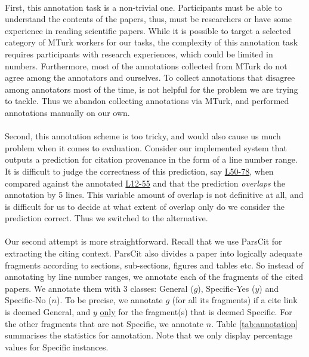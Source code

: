 \paragraph{}
First, this annotation task is a non-trivial one. Participants must be able to understand the contents of the papers, thus, must be researchers or have some experience in reading scientific papers. While it is possible to target a selected category of MTurk workers for our tasks, the complexity of this annotation task requires participants with research experiences, which could be limited in numbers. Furthermore, most of the annotations collected from MTurk do not agree among the annotators and ourselves. To collect annotations that disagree among annotators most of the time, is not helpful for the problem we are trying to tackle. Thus we abandon collecting annotations via MTurk, and performed annotations manually on our own.

\paragraph{}
Second, this annotation scheme is too tricky, and would also cause us much problem when it comes to evaluation. Consider our implemented system that outputs a prediction for citation provenance in the form of a line number range. It is difficult to judge the correctness of this prediction, say \url{L50-78}, when compared against the annotated \url{L12-55} and that the prediction \textit{overlaps} the annotation by 5 lines. This variable amount of overlap is not definitive at all, and is difficult for us to decide at what extent of overlap only do we consider the prediction correct. Thus we switched to the alternative.

\paragraph{}
Our second attempt is more straightforward. Recall that we use ParsCit for extracting the citing context. ParsCit also divides a paper into logically adequate fragments according to sections, sub-sections, figures and tables etc. So instead of annotating by line number ranges, we annotate each of the fragments of the cited papers. We annotate them with 3 classes: General ($g$), Specific-Yes ($y$) and Specific-No ($n$). To be precise, we annotate $g$ (for all its fragments) if a cite link is deemed General, and $y$ \underline{only} for the fragment(s) that is deemed Specific. For the other fragments that are not Specific, we annotate $n$. Table \ref{tab:annotation} summarises the statistics for annotation. Note that we only display percentage values for Specific instances.


